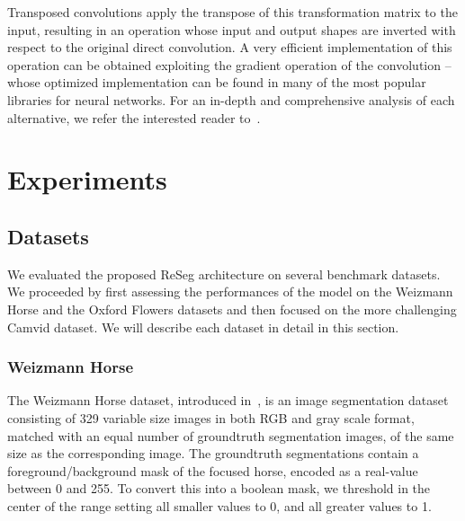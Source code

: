 Transposed convolutions apply the transpose of this transformation matrix to
the input, resulting in an operation whose input and output shapes are inverted
with respect to the original direct convolution. A very efficient implementation of
this operation can be obtained exploiting the gradient operation of the
convolution -- whose optimized implementation can be found in many of the most
popular libraries for neural networks. For an in-depth and comprehensive
analysis of each alternative, we refer the interested reader
to~\cite{dumoulin2016guide}.

\section{Experiments}\label{sec:reseg_experiments}

\subsection{Datasets}
We evaluated the proposed ReSeg architecture on several benchmark datasets.
We proceeded by first assessing the performances of the model on the Weizmann
Horse and the Oxford Flowers datasets and then focused on the more challenging
Camvid dataset. We will describe each dataset in detail in this section.

\subsubsection{Weizmann Horse}
The Weizmann Horse dataset, introduced in~\cite{Borenstein04combiningtop-down},
is an image
segmentation dataset consisting of 329 variable size images in both RGB and
gray scale
format, matched with an equal number of groundtruth segmentation images, of
the same size as the corresponding image.
The groundtruth segmentations contain a foreground/background mask of the
focused horse, encoded as a real-value between 0 and 255. To convert this into
a boolean mask, we threshold in the center of the range setting all smaller
values to 0, and all greater values to 1.


